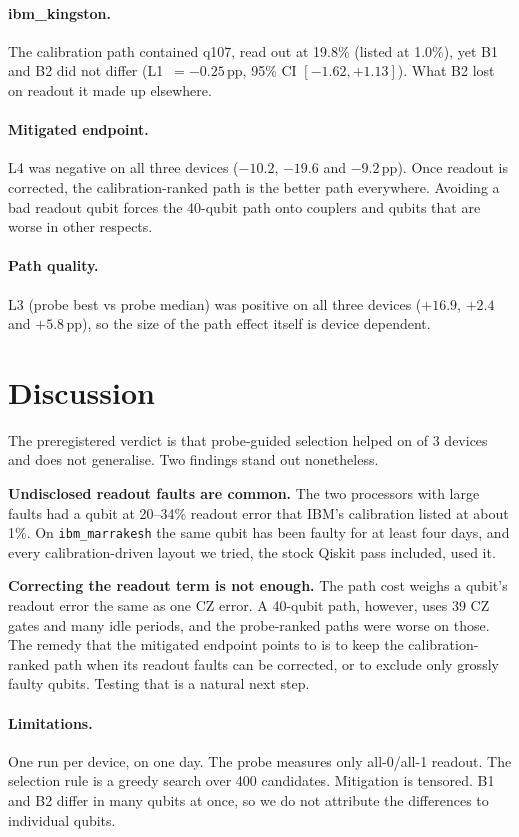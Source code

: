 \documentclass[10pt,twocolumn]{article}
\begin{document}
\paragraph{ibm\_kingston.} The calibration path contained q107, read out at 19.8\% (listed at 1.0\%),
yet B1 and B2 did not differ (L1~$=-0.25$\,pp, 95\% CI $[-1.62,+1.13]$). What B2 lost on readout it
made up elsewhere.

\paragraph{Mitigated endpoint.} L4 was negative on all three devices ($-10.2$, $-19.6$ and $-9.2$\,pp).
Once readout is corrected, the calibration-ranked path is the better path everywhere. Avoiding a bad
readout qubit forces the 40-qubit path onto couplers and qubits that are worse in other respects.

\paragraph{Path quality.} L3 (probe best vs probe median) was positive on all three devices
($+16.9$, $+2.4$ and $+5.8$\,pp), so the size of the path effect itself is device dependent.

\section{Discussion}
The preregistered verdict is that probe-guided selection helped on \HelpsCount{} of 3 devices and
does not generalise. Two findings stand out nonetheless.

\textbf{Undisclosed readout faults are common.} The two processors with large faults had a qubit
at 20--34\% readout error that IBM's calibration listed at about 1\%. On \texttt{ibm\_marrakesh} the
same qubit has been faulty for at least four days, and every calibration-driven layout we tried, the
stock Qiskit pass included, used it.

\textbf{Correcting the readout term is not enough.} The path cost weighs a qubit's readout error the
same as one CZ error. A 40-qubit path, however, uses 39 CZ gates and many idle periods, and the
probe-ranked paths were worse on those. The remedy that the mitigated endpoint points to is to keep the
calibration-ranked path when its readout faults can be corrected, or to exclude only grossly faulty
qubits. Testing that is a natural next step.

\paragraph{Limitations.} One run per device, on one day. The probe measures only all-0/all-1 readout.
The selection rule is a greedy search over 400 candidates. Mitigation is tensored. B1 and B2 differ in
many qubits at once, so we do not attribute the differences to individual qubits.
\end{document}
